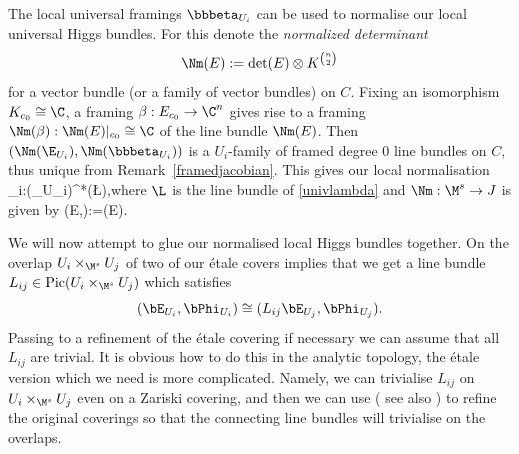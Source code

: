 The local universal framings $\bbbeta_{U_i}$  can be  used to normalise our local universal Higgs bundles. For this denote the {\em normalized determinant} $$\Nm(E):=\det(E)\otimes K^{n \choose 2}$$ for a vector bundle (or a family of vector bundles) on $C$. Fixing an isomorphism $K_{c_0}\cong \C$, a framing $\beta:E_{c_0}\to
\C^n$ gives rise to a framing $\Nm(\beta):\Nm(E)|_{c_0}\cong \C$ of the line bundle $\Nm(E)$.  Then $(\Nm(\E_{U_i}),\Nm(\bbbeta_{U_i}))$ is a $U_i$-family of framed degree $0$ line bundles on $C$, thus unique from Remark~\ref{framedjacobian}. This gives our local normalisation  \beq \label{determinant}\phi_i:\Nm(\bE_{U_i})\stackrel{\cong}{\to}\Nm^*(\L),\eeq where $\L$ is the line bundle of \eqref{univlambda} and $\Nm:\M^s\to J$ is  given by \beq \label{normdet} \Nm(E,\Phi):=\Nm(E).\eeq
{}






We will now attempt to glue our normalised local Higgs bundles together. On the overlap $U_i\times_{\M^s} U_j$  of two of our \'etale covers \cite[(4.2)]{hausel-thaddeus} implies that we get  a  line bundle $L_{ij}\in {\rm Pic}(U_i\times_{\M^s} U_j)$  which satisfies  $$(\bE_{U_i},\bPhi_{U_i})\cong (L_{ij}\bE_{U_j},\bPhi_{U_j}).$$ Passing to a refinement of the \'etale covering if necessary we can assume that all $L_{ij}$ are trivial. It is obvious how to do this in the analytic topology, the \'etale version which we need is  more complicated.   Namely, we can trivialise $L_{ij}$ on $U_i\times_{\M^s} U_j$ even on a Zariski covering, and then we can use \cite[Theorem 4.1]{artin} ( see also \cite[Lemma III.2.19]{milne}) to refine the original coverings so that the connecting line bundles will trivialise on the overlaps.

